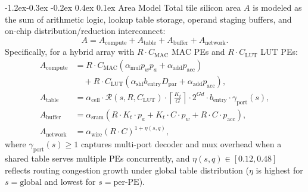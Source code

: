\documentclass[10pt,letterpaper,twocolumn]{article}
\makeatletter
\renewcommand\subsection{\@startsection{subsection}{2}{\z@}%
  {-1.2ex\@plus -0.3ex \@minus -0.2ex}%
  {0.4ex \@plus 0.1ex}%
  {\normalfont\normalsize\bfseries}}
\makeatother
\begin{document}
\subsection{Area Model}
Total tile silicon area $A$ is modeled as the sum of arithmetic logic, lookup table storage, operand staging buffers, and on-chip distribution/reduction interconnect:
\begin{equation}
  A = A_{\text{compute}} + A_{\text{table}} + A_{\text{buffer}} + A_{\text{network}}.
  \label{eq:area_total}
\end{equation}
Specifically, for a hybrid array with $R \cdot C_{\text{MAC}}$ MAC PEs and $R \cdot C_{\text{LUT}}$ LUT PEs:
\begin{align}
  A_{\text{compute}} &= R \cdot C_{\text{MAC}} \left( \alpha_{\text{mul}} p_w p_a + \alpha_{\text{add}} p_{\text{acc}} \right) \nonumber \\
                     &\quad + R \cdot C_{\text{LUT}} \left( \alpha_{\text{shf}} b_{\text{entry}} D_{\text{par}} + \alpha_{\text{add}} p_{\text{acc}} \right), \\
  A_{\text{table}}   &= \alpha_{\text{cell}} \cdot \mathcal{R}(s, R, C_{\text{LUT}}) \cdot \left\lceil \frac{K_t}{G} \right\rceil \cdot 2^{Gd} \cdot b_{\text{entry}} \cdot \gamma_{\text{port}}(s), \\
  A_{\text{buffer}}  &= \alpha_{\text{sram}} \left( R \cdot K_t \cdot p_a + K_t \cdot C \cdot p_w + R \cdot C \cdot p_{\text{acc}} \right), \\
  A_{\text{network}} &= \alpha_{\text{wire}} (R \cdot C)^{1 + \eta(s, q)},
\end{align}
where $\gamma_{\text{port}}(s) \ge 1$ captures multi-port decoder and mux overhead when a shared table serves multiple PEs concurrently, and $\eta(s, q) \in [0.12, 0.48]$ reflects routing congestion growth under global table distribution ($\eta$ is highest for $s=\text{global}$ and lowest for $s=\text{per-PE}$).
\end{document}

